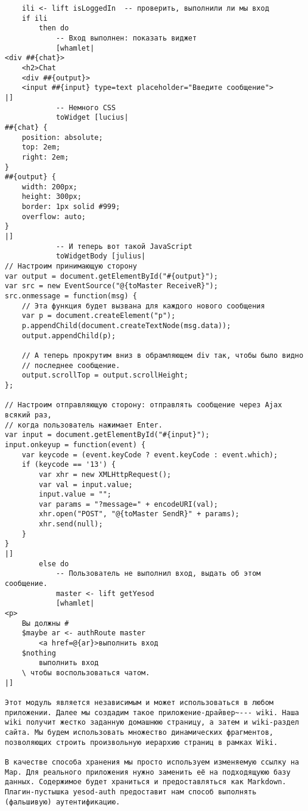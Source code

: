 \begin{lstlisting}
    ili <- lift isLoggedIn  -- проверить, выполнили ли мы вход
    if ili
        then do
            -- Вход выполнен: показать виджет
            [whamlet|
<div ##{chat}>
    <h2>Chat
    <div ##{output}>
    <input ##{input} type=text placeholder="Введите сообщение">
|]
            -- Немного CSS
            toWidget [lucius|
##{chat} {
    position: absolute;
    top: 2em;
    right: 2em;
}
##{output} {
    width: 200px;
    height: 300px;
    border: 1px solid #999;
    overflow: auto;
}
|]
            -- И теперь вот такой JavaScript
            toWidgetBody [julius|
// Настроим принимающую сторону
var output = document.getElementById("#{output}");
var src = new EventSource("@{toMaster ReceiveR}");
src.onmessage = function(msg) {
    // Эта функция будет вызвана для каждого нового сообщения
    var p = document.createElement("p");
    p.appendChild(document.createTextNode(msg.data));
    output.appendChild(p);

    // А теперь прокрутим вниз в обрамляющем div так, чтобы было видно
    // последнее сообщение.
    output.scrollTop = output.scrollHeight;
};

// Настроим отправляющую сторону: отправлять сообщение через Ajax всякий раз,
// когда пользователь нажимает Enter.
var input = document.getElementById("#{input}");
input.onkeyup = function(event) {
    var keycode = (event.keyCode ? event.keyCode : event.which);
    if (keycode == '13') {
        var xhr = new XMLHttpRequest();
        var val = input.value;
        input.value = "";
        var params = "?message=" + encodeURI(val);
        xhr.open("POST", "@{toMaster SendR}" + params);
        xhr.send(null);
    }
}
|]
        else do
            -- Пользователь не выполнил вход, выдать об этом сообщение.
            master <- lift getYesod
            [whamlet|
<p>
    Вы должны #
    $maybe ar <- authRoute master
        <a href=@{ar}>выполнить вход
    $nothing
        выполнить вход
    \ чтобы воспользоваться чатом.
|]

Этот модуль является независимым и может использоваться в любом приложении. Далее мы создадим такое приложение-драйвер~--- wiki. Наша wiki получит жестко заданную домашнюю страницу, а затем и wiki-раздел сайта. Мы будем использовать множество динамических фрагментов, позволяющих строить произвольную иерархию страниц в рамках Wiki.

В качестве способа хранения мы просто используем изменяемую ссылку на Map. Для реального приложения нужно заменить её на подходящуюю базу данных. Содержимое будет храниться и предоставляться как Markdown. Плагин-пустышка yesod-auth предоставит нам способ выполнять (фальшивую) аутентификацию.


\end{lstlisting}
